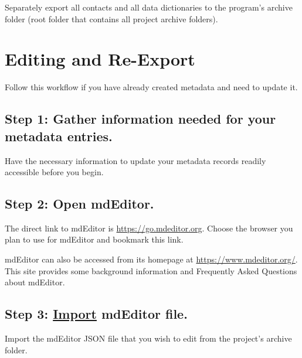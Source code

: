 \documentclass[
]{book}
\begin{document}
Separately export all contacts and all data dictionaries to the program's archive folder (root folder that contains all project archive folders).

\hypertarget{editing-and-re-export}{%
\section*{Editing and Re-Export}\label{editing-and-re-export}}

Follow this workflow if you have already created metadata and need to update it.

\hypertarget{step-1-gather-information-needed-for-your-metadata-entries.-1}{%
\subsection*{Step 1: Gather information needed for your metadata entries.}\label{step-1-gather-information-needed-for-your-metadata-entries.-1}}

Have the necessary information to update your metadata records readily accessible before you begin.

\hypertarget{step-2-open-mdeditor.-1}{%
\subsection*{Step 2: Open mdEditor.}\label{step-2-open-mdeditor.-1}}

The direct link to mdEditor is \url{https://go.mdeditor.org}. Choose the browser you plan to use for mdEditor and bookmark this link.

mdEditor can also be accessed from its homepage at \url{https://www.mdeditor.org/}. This site provides some background information and Frequently Asked Questions about mdEditor.

\hypertarget{step-3-import-mdeditor-file.}{%
\subsection*{\texorpdfstring{Step 3: \protect\hyperlink{import}{Import} mdEditor file.}{Step 3: Import mdEditor file.}}\label{step-3-import-mdeditor-file.}}

Import the mdEditor JSON file that you wish to edit from the project's archive folder.
\end{document}
